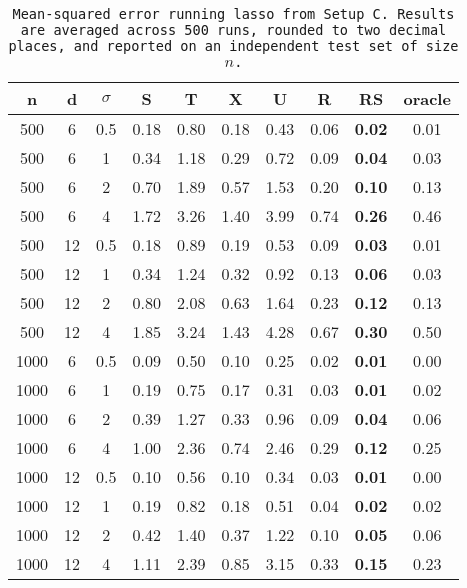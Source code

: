 \begin{table}[ht]
\centering
\begin{tabular}{cccccccccc}
  \hline
n & d & $\sigma$ & S & T & X & U & R & RS & oracle \\ 
  \hline
500 & 6 & 0.5 & 0.18 & 0.80 & 0.18 & 0.43 & 0.06 & \bf 0.02 & 0.01 \\ 
  500 & 6 & 1 & 0.34 & 1.18 & 0.29 & 0.72 & 0.09 & \bf 0.04 & 0.03 \\ 
  500 & 6 & 2 & 0.70 & 1.89 & 0.57 & 1.53 & 0.20 & \bf 0.10 & 0.13 \\ 
  500 & 6 & 4 & 1.72 & 3.26 & 1.40 & 3.99 & 0.74 & \bf 0.26 & 0.46 \\ 
  500 & 12 & 0.5 & 0.18 & 0.89 & 0.19 & 0.53 & 0.09 & \bf 0.03 & 0.01 \\ 
  500 & 12 & 1 & 0.34 & 1.24 & 0.32 & 0.92 & 0.13 & \bf 0.06 & 0.03 \\ 
  500 & 12 & 2 & 0.80 & 2.08 & 0.63 & 1.64 & 0.23 & \bf 0.12 & 0.13 \\ 
  500 & 12 & 4 & 1.85 & 3.24 & 1.43 & 4.28 & 0.67 & \bf 0.30 & 0.50 \\ 
  1000 & 6 & 0.5 & 0.09 & 0.50 & 0.10 & 0.25 & 0.02 & \bf 0.01 & 0.00 \\ 
  1000 & 6 & 1 & 0.19 & 0.75 & 0.17 & 0.31 & 0.03 & \bf 0.01 & 0.02 \\ 
  1000 & 6 & 2 & 0.39 & 1.27 & 0.33 & 0.96 & 0.09 & \bf 0.04 & 0.06 \\ 
  1000 & 6 & 4 & 1.00 & 2.36 & 0.74 & 2.46 & 0.29 & \bf 0.12 & 0.25 \\ 
  1000 & 12 & 0.5 & 0.10 & 0.56 & 0.10 & 0.34 & 0.03 & \bf 0.01 & 0.00 \\ 
  1000 & 12 & 1 & 0.19 & 0.82 & 0.18 & 0.51 & 0.04 & \bf 0.02 & 0.02 \\ 
  1000 & 12 & 2 & 0.42 & 1.40 & 0.37 & 1.22 & 0.10 & \bf 0.05 & 0.06 \\ 
  1000 & 12 & 4 & 1.11 & 2.39 & 0.85 & 3.15 & 0.33 & \bf 0.15 & 0.23 \\ 
   \hline
\end{tabular}
\caption{\tt Mean-squared error running \texttt{lasso} from Setup C. Results are averaged across 500 runs, rounded to two decimal places, and reported on an independent test set of size $n$.} 
\label{table:setup3}
\end{table}
